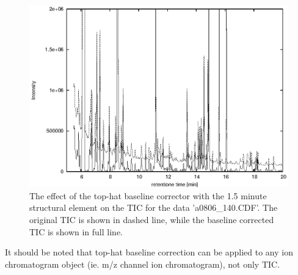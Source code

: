 \begin{figure}[htp]
\begin{center}
\includegraphics{graphics/pyms-test/tic_bc_tophat.eps}
\caption{The effect of the top-hat baseline corrector with the 1.5 minute
structural element on the TIC for the data 'a0806\_140.CDF'.  The original
TIC is shown in dashed line, while the baseline corrected TIC is shown in
full line.}
\label{fig:bc-tophat}
\end{center}
\end{figure}

It should be noted that top-hat baseline correction can be applied to any
ion chromatogram object (ie. m/z channel ion chromatogram), not only TIC.

